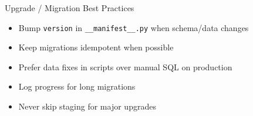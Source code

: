 \begin{frame}{Upgrade / Migration Best Practices}
\begin{itemize}
  \item Bump \texttt{version} in \texttt{\_\_manifest\_\_.py} when schema/data changes
  \item Keep migrations idempotent when possible
  \item Prefer data fixes in scripts over manual SQL on production
  \item Log progress for long migrations
  \item Never skip staging for major upgrades
\end{itemize}
\end{frame}
